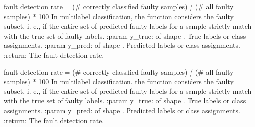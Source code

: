\documentclass[letterpaper,10pt,english]{sphinxmanual}
\begin{document}
\begin{fulllineitems}
\label{\detokenize{pusion.evaluation.evaluation_metrics:pusion.evaluation.evaluation_metrics.multilabel_subset_fdr}}
\sphinxAtStartPar
fault detection rate = (\# correctly classified faulty samples) / (\# all faulty samples) * 100
In multilabel classification, the function considers the faulty subset, i. e., if the entire set
of predicted faulty labels for a sample strictly match with the true set of faulty labels.
:param y\_true:  of shape . True labels or class assignments.
:param y\_pred:  of shape . Predicted labels or class assignments.
:return: The fault detection rate.

\end{fulllineitems}


\begin{fulllineitems}
\label{\detokenize{pusion.evaluation.evaluation_metrics:pusion.evaluation.evaluation_metrics.multilabel_minor_fdr}}
\sphinxAtStartPar
fault detection rate = (\# correctly classified faulty samples) / (\# all faulty samples) * 100
In multilabel classification, the function considers the faulty subset, i. e., if the entire set
of predicted faulty labels for a sample strictly match with the true set of faulty labels.
:param y\_true:  of shape . True labels or class assignments.
:param y\_pred:  of shape . Predicted labels or class assignments.
:return: The fault detection rate.

\end{fulllineitems}
\end{document}
